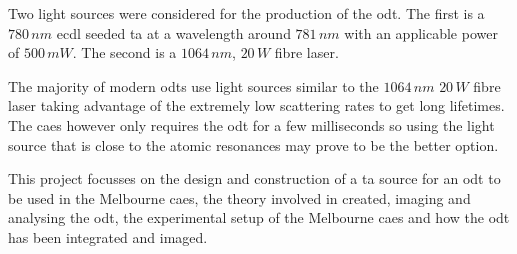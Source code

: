 Two light sources were considered for the production of the \gls{odt}. The first is a $780\,\unit{nm}$ \gls{ecdl} seeded \gls{ta} at a wavelength around $781\,\unit{nm}$ with an applicable power of $500\,\unit{mW}$. The second is a $1064\,\unit{nm}$, $20\,\unit{W}$ fibre laser.

The majority of modern \glspl{odt} use light sources similar to the $1064\,\unit{nm}$ $20\,\unit{W}$ fibre laser taking advantage of the extremely low scattering rates to get long lifetimes. The \gls{caes} however only requires the \gls{odt} for a few milliseconds so using the light source that is close to the atomic resonances may prove to be the better option.

This project focusses on the design and construction of a \gls{ta} source for an \gls{odt} to be used in the Melbourne \gls{caes}, the theory involved in created, imaging and analysing the \gls{odt}, the experimental setup of the Melbourne \gls{caes} and how the \gls{odt} has been integrated and imaged.




